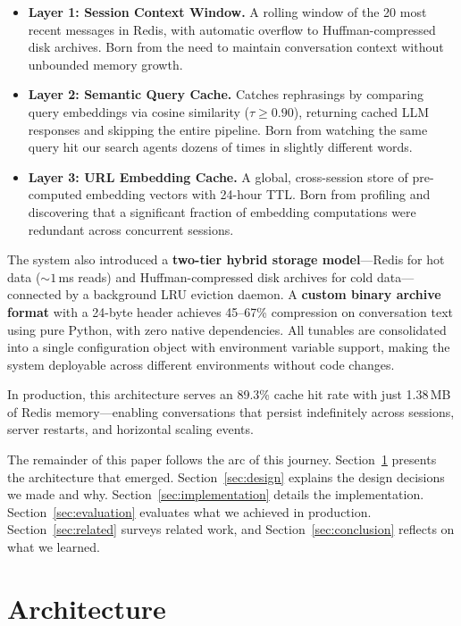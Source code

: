 \documentclass[conference]{IEEEtran}
\begin{document}
\begin{itemize}
\item \textbf{Layer 1: Session Context Window.} A rolling window of the 20 most recent messages in Redis, with automatic overflow to Huffman-compressed disk archives. Born from the need to maintain conversation context without unbounded memory growth.
\item \textbf{Layer 2: Semantic Query Cache.} Catches rephrasings by comparing query embeddings via cosine similarity ($\tau \geq 0.90$), returning cached LLM responses and skipping the entire pipeline. Born from watching the same query hit our search agents dozens of times in slightly different words.
\item \textbf{Layer 3: URL Embedding Cache.} A global, cross-session store of pre-computed embedding vectors with 24-hour TTL. Born from profiling and discovering that a significant fraction of embedding computations were redundant across concurrent sessions.
\end{itemize}

The system also introduced a \textbf{two-tier hybrid storage model}---Redis for hot data (${\sim}1$\,ms reads) and Huffman-compressed disk archives for cold data---connected by a background LRU eviction daemon. A \textbf{custom binary archive format} with a 24-byte header achieves 45--67\% compression on conversation text using pure Python, with zero native dependencies. All tunables are consolidated into a single configuration object with environment variable support, making the system deployable across different environments without code changes.

In production, this architecture serves an 89.3\% cache hit rate with just 1.38\,MB of Redis memory---enabling conversations that persist indefinitely across sessions, server restarts, and horizontal scaling events.

The remainder of this paper follows the arc of this journey. Section~\ref{sec:architecture} presents the architecture that emerged. Section~\ref{sec:design} explains the design decisions we made and why. Section~\ref{sec:implementation} details the implementation. Section~\ref{sec:evaluation} evaluates what we achieved in production. Section~\ref{sec:related} surveys related work, and Section~\ref{sec:conclusion} reflects on what we learned.

\section{Architecture}
\label{sec:architecture}
\end{document}
